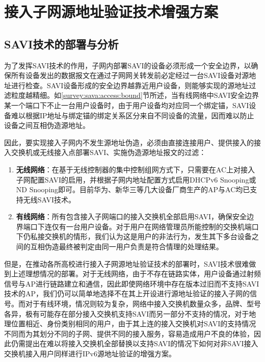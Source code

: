   \section{接入子网源地址验证技术增强方案}
  \label{IPv6_Security:access} 

    \subsection{SAVI技术的部署与分析}
    \label{IPv6_Security:access:deploy}

    为了发挥SAVI技术的作用，子网内部署SAVI的设备必须形成一个安全边界，以确保所有设备发出的数据报文在通过子网网关转发前必定经过一台SAVI设备对源地址进行检查。SAVI设备形成的安全边界越靠近用户设备，则能够实现的源地址过滤粒度越精细。如\ref{survey:sava:access:bound}节所述，当有线网络中SAVI安全边界某一个端口下不止一台用户设备时，由于用户设备均对应同一个绑定锚，SAVI设备难以根据IP地址与绑定锚的绑定关系区分来自不同设备的流量，因而难以防止设备之间互相伪造源地址。

    因此，要实现接入子网内不发生源地址伪造，必须由直接连接用户、提供接入的接入交换机或无线接入点部署SAVI、实施伪造源地址报文的过滤：
    \begin{enumerate}[1{)}]
      \item \textbf{无线网络}：在基于无线控制器的集中控制组网方式下，只需要在AC上对接入子网配置SAVI的启用，并根据子网内地址配置方式启用DHCPv6 Snooping或ND Snooping即可。目前华为、新华三等几大设备厂商生产的AP与AC均已支持无线SAVI技术。
      \item \textbf{有线网络}：所有包含接入子网端口的接入交换机全部启用SAVI，确保安全边界端口下连仅有一台用户设备。对于用户在网络管理员所能控制的交换机端口下仍私接交换机的情形，我们认为这是用户的非法行为，发生其下多台设备之间的互相伪造最终被判定由同一用户负责是符合情理的处理结果。
    \end{enumerate}

    但是，在推动各所高校进行接入子网源地址验证技术的部署时，SAVI技术很难做到上述理想情况的部署。对于无线网络，由于不存在链路实体，用户设备通过射频信号与AP进行链路建立和通信，因此即使网络环境中存在版本过旧而不支持SAVI技术的AP，我们仍可以简单地选择不在其上开设进行源地址验证的接入子网的信号。而对于有线环境，情况则较为复杂，网络中接入交换机数量众多，品牌、型号各异，极有可能存在部分接入交换机支持SAVI而另一部分不支持的情况，对于地理位置相近、身份类别相同的用户，由于其上连的接入交换机对SAVI的支持情况不同而为其划分不同的子网、提供不同的接入服务，容易造成用户不良的体验，因此仍需提出在难以将接入交换机全部替换以支持SAVI的情况下如何对非SAVI接入交换机接入用户同样进行IPv6源地址验证的增强方案。

